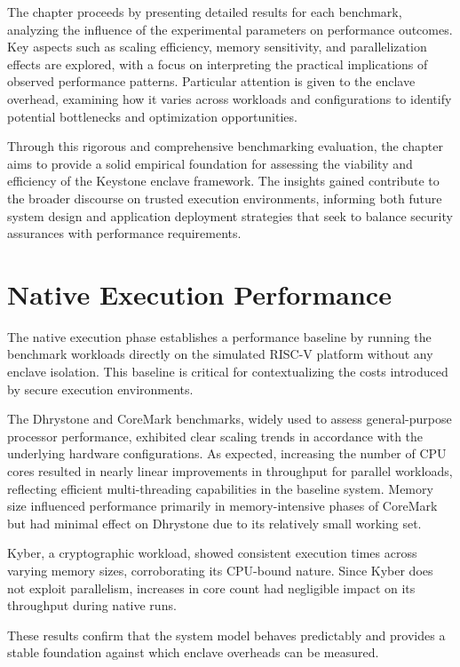 The chapter proceeds by presenting detailed results for each benchmark, analyzing the influence of the experimental parameters on performance outcomes. Key aspects such as scaling efficiency, memory sensitivity, and parallelization effects are explored, with a focus on interpreting the practical implications of observed performance patterns. Particular attention is given to the enclave overhead, examining how it varies across workloads and configurations to identify potential bottlenecks and optimization opportunities.

Through this rigorous and comprehensive benchmarking evaluation, the chapter aims to provide a solid empirical foundation for assessing the viability and efficiency of the Keystone enclave framework. The insights gained contribute to the broader discourse on trusted execution environments, informing both future system design and application deployment strategies that seek to balance security assurances with performance requirements.


\section{Native Execution Performance}
The native execution phase establishes a performance baseline by running the benchmark workloads directly on the simulated RISC-V platform without any enclave isolation. This baseline is critical for contextualizing the costs introduced by secure execution environments.

The Dhrystone and CoreMark benchmarks, widely used to assess general-purpose processor performance, exhibited clear scaling trends in accordance with the underlying hardware configurations. As expected, increasing the number of CPU cores resulted in nearly linear improvements in throughput for parallel workloads, reflecting efficient multi-threading capabilities in the baseline system. Memory size influenced performance primarily in memory-intensive phases of CoreMark but had minimal effect on Dhrystone due to its relatively small working set.

Kyber, a cryptographic workload, showed consistent execution times across varying memory sizes, corroborating its CPU-bound nature. Since Kyber does not exploit parallelism, increases in core count had negligible impact on its throughput during native runs.

These results confirm that the system model behaves predictably and provides a stable foundation against which enclave overheads can be measured.

